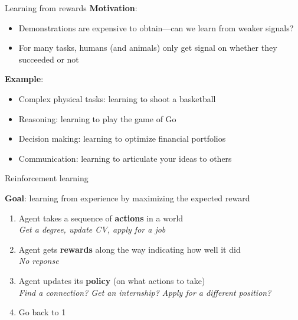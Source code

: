 \documentclass[usenames,dvipsnames,notes,11pt,aspectratio=169,hyperref={colorlinks=true, linkcolor=blue}]{beamer}
\begin{document}
\begin{frame}
    {Learning from rewards}
        \textbf{Motivation}:\\
            \begin{itemize}
                \item Demonstrations are expensive to obtain---can we learn from weaker signals?
                \item For many tasks, humans (and animals) only get signal on whether they succeeded or not 
            \end{itemize}

        \textbf{Example}:\\
            \begin{itemize}
                \item Complex physical tasks: learning to shoot a basketball 
                \item Reasoning: learning to play the game of Go 
                \item Decision making: learning to optimize financial portfolios
                \item Communication: learning to articulate your ideas to others
            \end{itemize}
\end{frame}

\begin{frame}
    {Reinforcement learning}

            {\bf Goal}: learning from experience by maximizing the expected reward\pause
            \begin{enumerate}[<+->]
                \item Agent takes a sequence of \textbf{actions} in a world \hfill {}\\
                    {\em Get a degree, update CV, apply for a job}
                \item Agent gets \textbf{rewards} along the way indicating how well it did \hfill {}\\
                    {\em No reponse}
                \item Agent updates its \textbf{policy} (on what actions to take) \hfill {}\\
                    {\em Find a connection? Get an internship? Apply for a different position?}
                \item Go back to 1 \hfill {} 
            \end{enumerate}
\end{frame}
\end{document}
